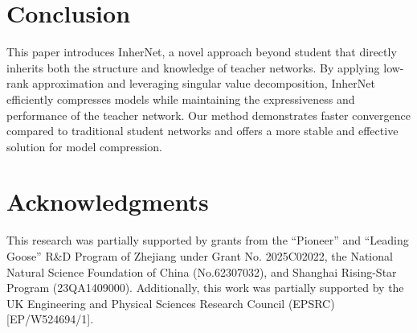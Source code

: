 \documentclass{article} %
\begin{document}

\vspace{-0.2cm}
\section{Conclusion}
\label{sec:conclusion}
\vspace{-0.1cm}

This paper introduces InherNet, a novel approach beyond student that directly inherits both the structure and knowledge of teacher networks. By applying low-rank approximation and leveraging singular value decomposition, InherNet efficiently compresses models while maintaining the expressiveness and performance of the teacher network. Our method demonstrates faster convergence compared to traditional student networks and offers a more stable and effective solution for model compression.

\section*{Acknowledgments}
This research was partially supported by grants from the ``Pioneer'' and ``Leading Goose'' R\&D Program of Zhejiang under Grant No. 2025C02022, the National Natural Science Foundation of China (No.62307032), and Shanghai Rising-Star Program (23QA1409000). Additionally, this work was partially supported by the UK Engineering and Physical Sciences Research Council (EPSRC) [EP/W524694/1].
\end{document}
